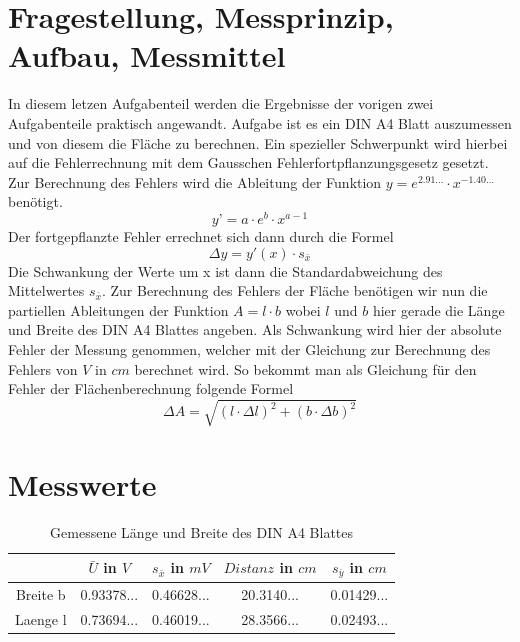 \documentclass[12pt,oneside,a4paper]{report}
\begin{document}
\section{Fragestellung, Messprinzip, Aufbau, Messmittel}
\label{chap:VERSUCH_3_FRAGESTELLUNG}
In diesem letzen Aufgabenteil werden die Ergebnisse der vorigen zwei Aufgabenteile praktisch angewandt. Aufgabe ist es ein DIN A4 Blatt auszumessen und von diesem die Fläche zu berechnen. Ein spezieller Schwerpunkt wird hierbei auf die Fehlerrechnung mit dem Gausschen Fehlerfortpflanzungsgesetz gesetzt. Zur Berechnung des Fehlers wird die Ableitung der Funktion $y = e^{2.91...} \cdot x^{-1.40...}$ benötigt.
\begin{equation}
y’ = a \cdot e^b \cdot x^{a-1}
\end{equation}
Der fortgepflanzte Fehler errechnet sich dann durch die Formel
\begin{equation}
\Delta y = y'(x) \cdot s_{\bar{x}}
\end{equation}
Die Schwankung der Werte um x ist dann die Standardabweichung des Mittelwertes $s_{\bar{x}}$.
Zur Berechnung des Fehlers der Fläche benötigen wir nun die partiellen Ableitungen der Funktion $A = l \cdot b$ wobei $l$ und $b$ hier gerade die Länge und Breite des DIN A4 Blattes angeben. Als Schwankung wird hier der absolute Fehler der Messung genommen, welcher mit der Gleichung zur Berechnung des Fehlers von $V$ in $cm$ berechnet wird. So bekommt man als Gleichung für den Fehler der Flächenberechnung folgende Formel
\begin{equation}
\Delta A = \sqrt{(l \cdot \Delta l)^2 + (b \cdot \Delta b)^2}
\end{equation}

\section{Messwerte}
\label{chap:VERSUCH_3_MESSWERTE}
\begin{table}[H]
\centering
\begin{tabular}{c|cccc}
 & $\bar{U}$ in $V$ & $s_{\bar{x}}$ in $mV$ & $Distanz$ in $cm$ & $s_{\bar{y}}$ in $cm$\\
\hline Breite b & 0.93378... & 0.46628... & 20.3140... & 0.01429...\\ 
       Laenge l & 0.73694... & 0.46019... & 28.3566... & 0.02493... \\ 
\end{tabular} 
\caption{Gemessene Länge und Breite des DIN A4 Blattes}
\label{tab:DINA4_MESSWERTE}
\end{table}
\end{document}
